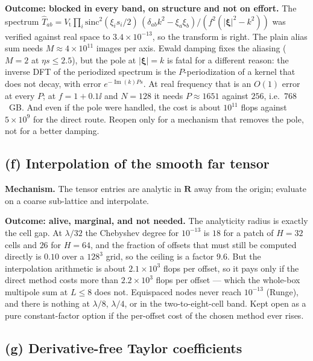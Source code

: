 \textbf{Outcome: blocked in every band, on structure and not on effort.} The spectrum
$\widehat{T}_{ab} = V_{\mathrm{t}}\prod_i\mathrm{sinc}^2(\xi_is_i/2)\,
(\delta_{ab}k^2-\xi_a\xi_b)/(f^2(|\boldsymbol{\xi}|^2-k^2))$ was verified against real
space to $3.4\times10^{-13}$, so the transform is right. The plain alias sum needs
$M \approx 4\times10^{11}$ images per axis. Ewald damping fixes the aliasing ($M = 2$ at
$\eta s \le 2.5$), but the pole at $|\boldsymbol{\xi}| = k$ is fatal for a different
reason: the inverse DFT of the periodized spectrum is the $P$-periodization of a kernel
that does not decay, with error $e^{-\operatorname{Im}(k)Ps}$. At real frequency that is
an $O(1)$ error at every $P$; at $f = 1+0.1\ii$ and $N = 128$ it needs $P \approx 1651$
against $256$, i.e.\ $768$~GB. And even if the pole were handled, the cost is about
$10^{11}$ flops against $5\times10^{9}$ for the direct route. Reopen only for a mechanism
that removes the pole, not for a better damping.

\subsection{(f) Interpolation of the smooth far tensor}
\label{sec:reg:f}

\textbf{Mechanism.} The tensor entries are analytic in $\mathbf{R}$ away from the origin;
evaluate on a coarse sub-lattice and interpolate.

\textbf{Outcome: alive, marginal, and not needed.} The analyticity radius is exactly the
cell gap. At $\lambda/32$ the Chebyshev degree for $10^{-13}$ is $18$ for a patch of
$H = 32$ cells and $26$ for $H = 64$, and the fraction of offsets that must still be
computed directly is $0.10$ over a $128^3$ grid, so the ceiling is a factor $9.6$. But the
interpolation arithmetic is about $2.1\times10^{3}$ flops per offset, so it pays only if
the direct method costs more than $2.2\times10^{3}$ flops per offset --- which the
whole-box multipole sum at $L \le 8$ does not. Equispaced nodes never reach $10^{-13}$
(Runge), and there is nothing at $\lambda/8$, $\lambda/4$, or in the two-to-eight-cell
band. Kept open as a pure constant-factor option if the per-offset cost of the chosen
method ever rises.

\subsection{(g) Derivative-free Taylor coefficients}
\label{sec:reg:g}

